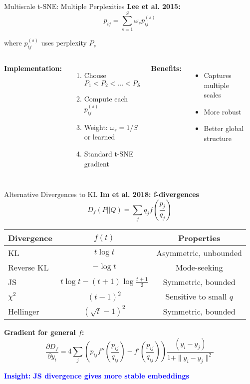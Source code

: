 \documentclass[aspectratio=169]{beamer}
\newcommand{\conceptbox}[2]{\colorbox{#1!20}{\textcolor{#1}{\textbf{#2}}}}
\newcommand{\insight}[1]{\conceptbox{blue}{Insight: #1}}
\begin{document}
\begin{frame}{Multiscale t-SNE: Multiple Perplexities}
\textbf{Lee et al. 2015:}
$$p_{ij} = \sum_{s=1}^S \omega_s p_{ij}^{(s)}$$

where $p_{ij}^{(s)}$ uses perplexity $P_s$

\begin{columns}
\textbf{Implementation:}
\begin{enumerate}
\item Choose $P_1 < P_2 < ... < P_S$
\item Compute each $p_{ij}^{(s)}$
\item Weight: $\omega_s = 1/S$ or learned
\item Standard t-SNE gradient
\end{enumerate}

\textbf{Benefits:}
\begin{itemize}
\item Captures multiple scales
\item More robust
\item Better global structure
\end{itemize}

\begin{center}
\end{center}
\end{columns}
\end{frame}

\begin{frame}{Alternative Divergences to KL}
\textbf{Im et al. 2018: f-divergences}
$$D_f(P||Q) = \sum_j q_j f\left(\frac{p_j}{q_j}\right)$$

\begin{center}
\begin{tabular}{l|c|c}
\textbf{Divergence} & \textbf{$f(t)$} & \textbf{Properties} \\
\hline
KL & $t \log t$ & Asymmetric, unbounded \\
Reverse KL & $-\log t$ & Mode-seeking \\
JS & $t\log t - (t+1)\log\frac{t+1}{2}$ & Symmetric, bounded \\
$\chi^2$ & $(t-1)^2$ & Sensitive to small $q$ \\
Hellinger & $(\sqrt{t} - 1)^2$ & Symmetric, bounded \\
\end{tabular}
\end{center}

\textbf{Gradient for general $f$:}
$$\frac{\partial D_f}{\partial y_i} = 4\sum_j \left(p_{ij}f''\left(\frac{p_{ij}}{q_{ij}}\right) - f'\left(\frac{p_{ij}}{q_{ij}}\right)\right)\frac{(y_i - y_j)}{1 + \|y_i - y_j\|^2}$$

\insight{JS divergence gives more stable embeddings}
\end{frame}
\end{document}
